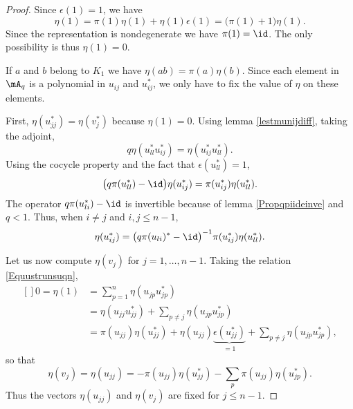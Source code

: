 \begin{proof}
    Since $\epsilon(1)=1$, we have
    \begin{equation}
        \eta(1)=\pi(1)\eta(1)+\eta(1)\epsilon(1)=\big( \pi(1)+1 \big)\eta(1).
    \end{equation}
    Since the representation is nondegenerate we have $\pi(1)=\id$. The only possibility is thus $\eta(1)=0$.

    If $a$ and $b$ belong to $K_1$ we have $\eta(ab)=\pi(a)\eta(b)$. Since each element in $\mA_q$ is a polynomial in $u_{ij}$ and $u_{ij}^*$, we only have to fix the value of $\eta$ on these elements.

    First, $\eta(u_{jj}^*)=\eta(v_j^*)$ because $\eta(1)=0$. Using lemma \ref{lestmunijdiff}, taking the adjoint,
    \begin{equation}
        q\eta(u_{ll}^*u_{ij}^*)=\eta(u_{ij}^*u_{ll}^*).
    \end{equation}
    Using the cocycle property and the fact that $\epsilon(u_{ll}^*)=1$,
    \begin{equation}
        \big( q\pi(u_{ll}^*)-\id \big)\eta(u_{ij}^*)=\pi(u_{ij}^*)\eta(u_{ll}^*).
    \end{equation}
    The operator $q\pi(u_{li}^*)-\id$ is invertible because of lemma \ref{Propqpiideinve} and $q<1$. Thus, when $i\neq j$ and $i,j\leq n-1$, 
    \begin{equation}
        \eta(u_{ij}^*)=\big( q\pi(u_{li})^*-\id \big)^{-1}\pi(u_{ij}^*)\eta(u_{ll}^*).
    \end{equation}

    Let us now compute $\eta(v_j)$ for $j=1,\ldots,n-1$. Taking the relation \eqref{Equustrunsuqn},
    \begin{equation}
        \begin{aligned}[]
            0=\eta(1)&=\sum_{p=1}^n\eta(u_{jp}u_{jp}^*)\\
            &=\eta(u_{jj}u_{jj}^*)+\sum_{p\neq j}\eta(u_{jp}u_{jp}^*)\\
            &=\pi(u_{jj})\eta(u_{jj}^*)+\eta(u_{jj})\underbrace{\epsilon(u_{jj}^*)}_{=1}+\sum_{p\neq j}\eta(u_{jp}u_{jp}^*),
        \end{aligned}
    \end{equation}
    so that
    \begin{equation}        \label{Eqetaujjpiu}
        \eta(v_j)=\eta(u_{jj})=-\pi(u_{jj})\eta(u_{jj}^*)-\sum_p\pi(u_{jj})\eta(u_{jp}^*).
    \end{equation}
    Thus the vectors $\eta(u_{jj})$ and $\eta(v_j)$ are fixed for $j\leq n-1$.


\end{proof}
